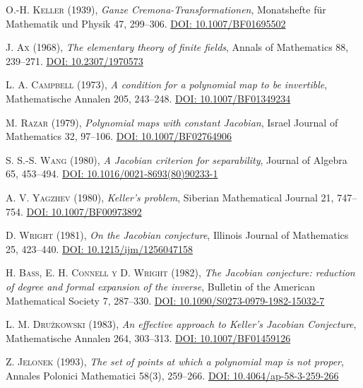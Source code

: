 \documentclass[11pt]{article}
\theoremstyle{definition}
\theoremstyle{remark}
\newcommand{\bibauthor}[1]{\textsc{#1}}
\newcommand{\biblink}[2]{\href{#1}{\sffamily\footnotesize\color{teal!75!black}#2}}
\begin{document}
\begin{thebibliography}{99}

\bibauthor{O.-H. Keller} (1939),
\emph{Ganze Cremona-Transformationen},
Monatshefte f\"ur Mathematik und Physik 47, 299--306.
\biblink{https://doi.org/10.1007/BF01695502}{DOI: 10.1007/BF01695502}

\bibauthor{J. Ax} (1968),
\emph{The elementary theory of finite fields},
Annals of Mathematics 88, 239--271.
\biblink{https://doi.org/10.2307/1970573}{DOI: 10.2307/1970573}

\bibauthor{L. A. Campbell} (1973),
\emph{A condition for a polynomial map to be invertible},
Mathematische Annalen 205, 243--248.
\biblink{https://doi.org/10.1007/BF01349234}{DOI: 10.1007/BF01349234}

\bibauthor{M. Razar} (1979),
\emph{Polynomial maps with constant Jacobian},
Israel Journal of Mathematics 32, 97--106.
\biblink{https://doi.org/10.1007/BF02764906}{DOI: 10.1007/BF02764906}

\bibauthor{S. S.-S. Wang} (1980),
\emph{A Jacobian criterion for separability},
Journal of Algebra 65, 453--494.
\biblink{https://doi.org/10.1016/0021-8693(80)90233-1}{DOI: 10.1016/0021-8693(80)90233-1}

\bibauthor{A. V. Yagzhev} (1980),
\emph{Keller's problem},
Siberian Mathematical Journal 21, 747--754.
\biblink{https://doi.org/10.1007/BF00973892}{DOI: 10.1007/BF00973892}

\bibauthor{D. Wright} (1981),
\emph{On the Jacobian conjecture},
Illinois Journal of Mathematics 25, 423--440.
\biblink{https://doi.org/10.1215/ijm/1256047158}{DOI: 10.1215/ijm/1256047158}

\bibauthor{H. Bass, E. H. Connell y D. Wright} (1982),
\emph{The Jacobian conjecture: reduction of degree and formal expansion of
the inverse}, Bulletin of the American Mathematical Society 7, 287--330.
\biblink{https://doi.org/10.1090/S0273-0979-1982-15032-7}{DOI: 10.1090/S0273-0979-1982-15032-7}

\bibauthor{L. M. Dru\.zkowski} (1983),
\emph{An effective approach to Keller's Jacobian Conjecture},
Mathematische Annalen 264, 303--313.
\biblink{https://doi.org/10.1007/BF01459126}{DOI: 10.1007/BF01459126}

\bibauthor{Z. Jelonek} (1993),
\emph{The set of points at which a polynomial map is not proper},
Annales Polonici Mathematici 58(3), 259--266.
\biblink{https://doi.org/10.4064/ap-58-3-259-266}{DOI: 10.4064/ap-58-3-259-266}


\end{thebibliography}
\end{document}
